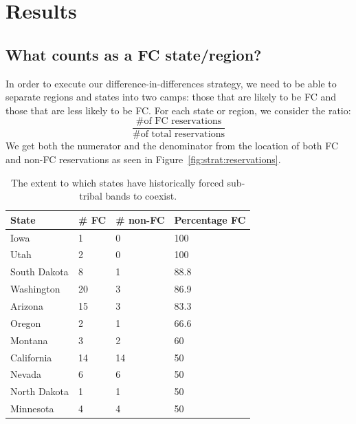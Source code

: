 \documentclass[12pt]{article}
\begin{document}
\section{Results}

\subsection{What counts as a FC state/region?}
In order to execute our difference-in-differences strategy, we need to be able to separate regions and states into two camps: those that are likely to be FC and those that are less likely to be FC. For each state or region, we consider the ratio:
$$\frac{\mbox{\# of FC reservations}}{\mbox{\# of total reservations}}$$
We get both the numerator and the denominator from the location of both FC and non-FC reservations as seen in Figure~\ref{fig:strat:reservations}.


\begin{table}[ht!]
    \centering
    \begin{tabular}{ | l | l | l | l | }\hline\hline
    State        & \# FC & \# non-FC & Percentage FC \\\hline
    Iowa         & 1     & 0         & 100           \\
    Utah         & 2     & 0         & 100           \\
    South Dakota & 8     & 1         & 88.8          \\
    Washington   & 20    & 3         & 86.9          \\
    Arizona      & 15    & 3         & 83.3          \\
    Oregon       & 2     & 1         & 66.6          \\
    Montana      & 3     & 2         & 60            \\
    California   & 14    & 14        & 50            \\
    Nevada       & 6     & 6         & 50            \\
    North Dakota & 1     & 1         & 50            \\
    Minnesota    & 4     & 4         & 50            \\\hline
    \end{tabular}
    \caption{The extent to which states have historically forced sub-tribal bands to coexist.}
    \label{fcpercent}
\end{table}
\end{document}
